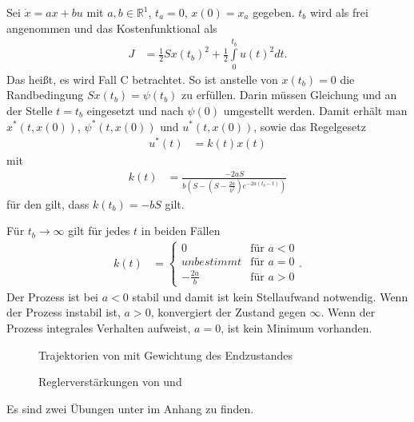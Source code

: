 \begin{exmp}\label{exmp:kap_2_vor_optlsg_2}
Sei $\dot{x}=ax+bu$ mit $a,b\in\mathbb{R}^1$, $t_a=0$, $x(0)=x_a$ gegeben. $t_b$ wird als frei angenommen und das Kostenfunktional als
\begin{align*}
	J & = \frac12 Sx(t_b)^2 + \frac12\int\limits_0^{t_b}u(t)^2dt.
\end{align*}
Das heißt, es wird Fall C betrachtet. So ist anstelle von $x(t_b)=0$ die Randbedingung $Sx(t_b)=\psi(t_b)$ zu erfüllen. Darin müssen Gleichung
 und  an der Stelle $t=t_b$ eingesetzt und nach $\psi(0)$ umgestellt werden. Damit
erhält man $x^{\ast}\left(t,x(0) \right)$, $\psi^{\ast}\left(t,x(0) \right)$ und $u^{\ast}\left(t,x(0) \right)$, sowie das Regelgesetz
\begin{align*}
	u^{\ast}(t) & = k(t) x(t)
\end{align*}
mit
\begin{align*}
	k(t) & = \frac{-2a S}{b\left(S-\left(S-\frac{2a}{b^2} \right)e^{-2a(t_b-t)} \right)}
\end{align*}
für den gilt, dass $k(t_b)=-bS$ gilt.

Für $t_b\rightarrow\infty$ gilt für jedes $t$ in beiden Fällen
\begin{align*}
	k(t) & = \left\{\begin{array}{cl}
	0 & \text{für } a < 0\\
	unbestimmt & \text{für } a = 0\\
	-\frac{2a}{b} & \text{für } a > 0
	\end{array}\right. .
\end{align*}
Der Prozess ist bei $a<0$ stabil und damit ist kein Stellaufwand notwendig. Wenn der Prozess instabil ist, $a > 0$, konvergiert der Zustand gegen
$\infty$. Wenn der Prozess integrales Verhalten aufweist, $a=0$, ist kein Minimum vorhanden.
\end{exmp}
\begin{figure}[htb]
	\centering
	
	\caption{Trajektorien von  mit Gewichtung des Endzustandes}
	\label{fig:kap_2_vor_optlsg_exmp_2}
\end{figure}
\begin{figure}[htb]
	\centering
	
	\caption{Reglerverstärkungen von  und }
	\label{fig:kap_2_vor_optlsg_exmp_2_k}
\end{figure}
Es sind zwei Übungen unter  im Anhang zu finden.

